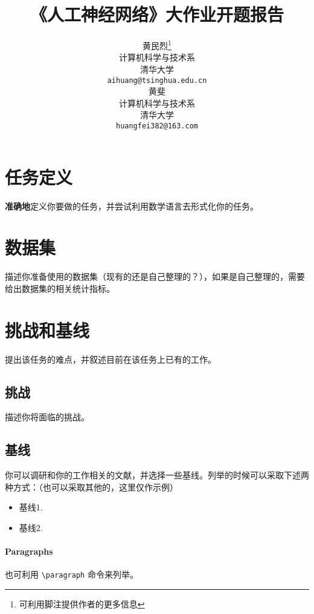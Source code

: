 \documentclass{article}
\title{《人工神经网络》大作业开题报告}
\author{
  黄民烈\thanks{可利用脚注提供作者的更多信息} \\
  计算机科学与技术系 \\
  清华大学 \\
  \texttt{aihuang@tsinghua.edu.cn} \\
  \AND
  黄斐\\
  计算机科学与技术系 \\
  清华大学 \\
  \texttt{huangfei382@163.com} \\
}
\begin{document}
\maketitle



\section{任务定义}

\textbf{准确地}定义你要做的任务，并尝试利用数学语言去形式化你的任务。

\section{数据集}

描述你准备使用的数据集（现有的还是自己整理的？），如果是自己整理的，需要给出数据集的相关统计指标。


\section{挑战和基线}

提出该任务的难点，并叙述目前在该任务上已有的工作。

\subsection{挑战}

描述你将面临的挑战。

\subsection{基线}

你可以调研和你的工作相关的文献，并选择一些基线。列举的时候可以采取下述两种方式：（也可以采取其他的，这里仅作示例）


\begin{itemize}

\item 基线1.

\item 基线2.

\end{itemize}

\paragraph{Paragraphs}

也可利用 \verb+\paragraph+ 命令来列举。
\end{document}
